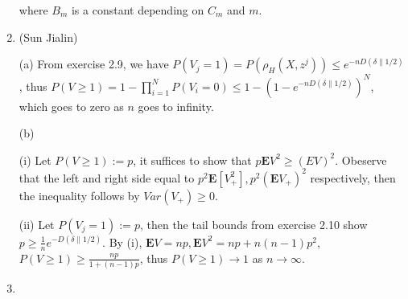 \begin{enumerate}
	where $ B_{m} $ is a constant depending on $ C_{m} $ and $ m $.
	
	\item
	(Sun Jialin)
	
	(a) From exercise 2.9, we have $ P(V_{j}=1)=P(\rho_{H}(X,z^{j}))\leq e^{-nD(\delta\parallel 1/2)} $, thus
	$ P(V\geq 1)=1-\prod_{i=1}^{N}P(V_{i}=0) \leq 1-(1-e^{-nD(\delta\parallel 1/2)})^{N} $, which goes to zero as $ n $ goes to infinity.
	
	(b)
	
	(i) Let $ P(V\geq 1) := p $, it suffices to show that $ p\bm{E}V^{2} \geq (EV)^{2} $. Obeserve that the left and right side equal to $ p^{2}\bm{E}[V^{2}_{+}], p^{2}(\bm{E}V_{+})^{2} $ respectively, then the inequality follows by $ Var(V_{+}) \geq 0 $.
	
	(ii) Let $P(V_{j}=1):=p$, then the tail bounds from exercise 2.10 show $ p\geq \frac{1}{n}e^{-D(\delta\parallel 1/2)} $.
	By (i), $ \bm{E}V=np, \bm{E}V^{2}=np+n(n-1)p^{2} $, $ P(V\geq 1) \geq \frac{np}{1+(n-1)p} $, thus $ P(V\geq 1) \to 1 $ as $ n \to \infty $.
	
	\item
	
	
\end{enumerate}